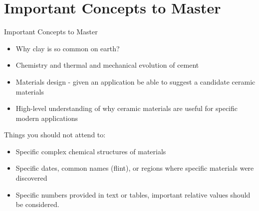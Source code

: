 \documentclass{libs/XJTLU_format}
\begin{document}
\section{Important Concepts to Master}
\begin{frame}{Important Concepts to Master}
\begin{itemize}
    \item Why clay is so common on earth?
    \item Chemistry and thermal and mechanical evolution of cement
    \item Materials design - given an application be able to suggest a candidate ceramic materials
    \item High-level understanding of why ceramic materials are useful for specific modern applications
\end{itemize}

Things you should not attend to:
\begin{itemize}
    \item Specific complex chemical structures of materials
    \item Specific dates, common names (flint), or regions where specific materials were discovered
    \item Specific numbers provided in text or tables, important relative values should be considered.
\end{itemize}
    
\end{frame}


    
\end{document}
